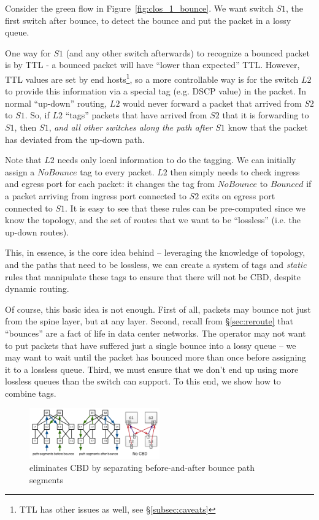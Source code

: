 Consider the green flow in Figure~\ref{fig:clos_1_bounce}.  We want switch $S1$,
the first switch after bounce, to detect the bounce and put the packet in a
lossy queue.

One way for $S1$ (and any other switch afterwards) to recognize a bounced packet
is by TTL - a bounced packet will have ``lower than expected'' TTL. However, TTL
values are set by end hosts\footnote{TTL has other issues as well, see
\S\ref{subsec:caveats}}, so a more controllable way is for the switch $L2$ to
provide this information via a special tag (e.g. DSCP value) in the packet. In
normal ``up-down'' routing, $L2$ would never forward a packet that arrived from
$S2$ to $S1$. So, if $L2$ ``tags'' packets that have arrived from $S2$ that it
is forwarding to $S1$, then $S1$, {\em and all other switches along the path
after $S1$} know that the packet has deviated from the up-down path.

Note that $L2$ needs only local information to do the tagging. We can initially
assign a $NoBounce$ tag to every packet. $L2$ then simply needs to check ingress
and egress port for each packet: it changes the tag from $NoBounce$ to $Bounced$
if a packet arriving from ingress port connected to $S2$ exits on egress port
connected to $S1$.  It is easy to see that these rules can be pre-computed since
we know the topology, and the set of routes that we want to be ``lossless''
(i.e. the up-down routes).

This, in essence, is the core idea behind \sysname{} -- leveraging the knowledge of
topology, and the paths that need to be lossless, we can create a system of tags
and {\em static} rules that manipulate these tags to ensure that there will not
be CBD, despite dynamic routing.

Of course, this basic idea is not enough. First of all, packets may bounce not
just from the spine layer, but at any layer. Second, recall from
\S\ref{sec:reroute} that ``bounces'' are a fact of life in data center networks.
The operator may not want to put packets that have suffered just a single bounce
into a lossy queue -- we may want to wait until the packet has bounced more than
once before assigning it to a lossless queue. Third, we must ensure that we
don't end up using more lossless queues than the switch can support. To this
end, we show how to combine tags.

\begin{figure}[t]
	\centering
	\includegraphics[width=0.5\textwidth] {figs/cbd_b}
	\caption{\sysname{} eliminates CBD by separating before-and-after bounce path segments}
	\label{fig:clos_tagger}
\end{figure}


